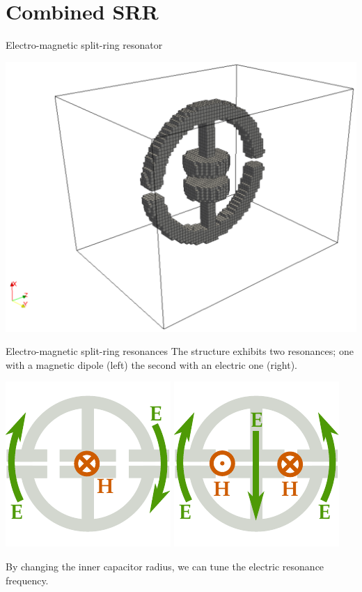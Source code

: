 \documentclass[t]{beamer} \usepackage[english]{babel} \usepackage[utf8]{inputenc} \usetheme{Frankfurt} %
\begin{document}
\section{Combined SRR}
\begin{frame}{Electro-magnetic split-ring resonator}%

\hfill\includegraphics[width=.85\textwidth]{../img-cdh-new/emSRR_snapshot.pdf} \hfill\;
\end{frame} %

\begin{frame}{Electro-magnetic split-ring resonances}%
The structure exhibits two resonances; one with a magnetic dipole (left) the second with an electric one (right).

\hfill\includegraphics[height=0.22\textwidth]{../img/drawing_emcSRRpad_resM.pdf}\hfill
\includegraphics[height=0.22\textwidth]{../img/drawing_emcSRRpad_resE2.pdf}\hfill\;

By changing the inner capacitor radius, we can tune the electric resonance frequency.
\end{frame} %
\end{document}
